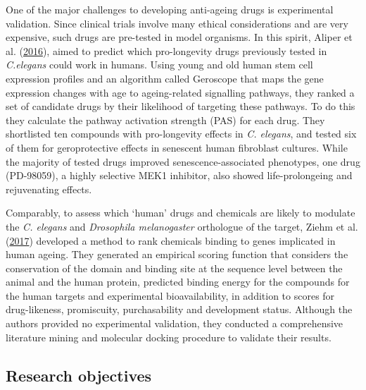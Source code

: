\documentclass[12pt,twoside]{unicam}
\begin{document}
One of the major challenges to developing anti-ageing drugs is experimental validation. Since clinical trials involve many ethical considerations and are very expensive, such drugs are pre-tested in model organisms. In this spirit, Aliper et al. (\protect\hyperlink{ref-Aliper2016}{2016}), aimed to predict which pro-longevity drugs previously tested in \emph{C.elegans} could work in humans. Using young and old human stem cell expression profiles and an algorithm called Geroscope that maps the gene expression changes with age to ageing-related signalling pathways, they ranked a set of candidate drugs by their likelihood of targeting these pathways. To do this they calculate the pathway activation strength (PAS) for each drug. They shortlisted ten compounds with pro-longevity effects in \emph{C. elegans}, and tested six of them for geroprotective effects in senescent human fibroblast cultures. While the majority of tested drugs improved senescence-associated phenotypes, one drug (PD-98059), a highly selective MEK1 inhibitor, also showed life-prolongeing and rejuvenating effects.

Comparably, to assess which `human' drugs and chemicals are likely to modulate the \emph{C. elegans} and \emph{Drosophila melanogaster} orthologue of the target, Ziehm et al. (\protect\hyperlink{ref-Ziehm2017}{2017}) developed a method to rank chemicals binding to genes implicated in human ageing. They generated an empirical scoring function that considers the conservation of the domain and binding site at the sequence level between the animal and the human protein, predicted binding energy for the compounds for the human targets and experimental bioavailability, in addition to scores for drug-likeness, promiscuity, purchasability and development status. Although the authors provided no experimental validation, they conducted a comprehensive literature mining and molecular docking procedure to validate their results.

\hypertarget{research-objectives-2}{%
\subsection{Research objectives}\label{research-objectives-2}}
\end{document}
